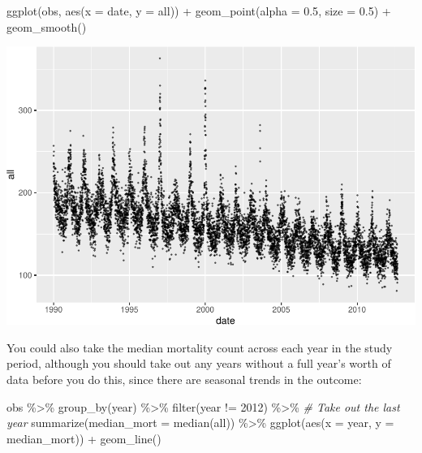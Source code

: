 \documentclass[
]{book}
\newenvironment{Shaded}{\begin{snugshade}}{\end{snugshade}}
\newcommand{\AttributeTok}[1]{\textcolor[rgb]{0.77,0.63,0.00}{#1}}
\newcommand{\CommentTok}[1]{\textcolor[rgb]{0.56,0.35,0.01}{\textit{#1}}}
\newcommand{\DecValTok}[1]{\textcolor[rgb]{0.00,0.00,0.81}{#1}}
\newcommand{\FloatTok}[1]{\textcolor[rgb]{0.00,0.00,0.81}{#1}}
\newcommand{\FunctionTok}[1]{\textcolor[rgb]{0.00,0.00,0.00}{#1}}
\newcommand{\NormalTok}[1]{#1}
\newcommand{\SpecialCharTok}[1]{\textcolor[rgb]{0.00,0.00,0.00}{#1}}
\begin{document}
\begin{Shaded}
\begin{Highlighting}[]
\FunctionTok{ggplot}\NormalTok{(obs, }\FunctionTok{aes}\NormalTok{(}\AttributeTok{x =}\NormalTok{ date, }\AttributeTok{y =}\NormalTok{ all)) }\SpecialCharTok{+} 
  \FunctionTok{geom\_point}\NormalTok{(}\AttributeTok{alpha =} \FloatTok{0.5}\NormalTok{, }\AttributeTok{size =} \FloatTok{0.5}\NormalTok{) }\SpecialCharTok{+} 
  \FunctionTok{geom\_smooth}\NormalTok{()}
\end{Highlighting}
\end{Shaded}

\includegraphics{adv_epi_analysis_files/figure-latex/unnamed-chunk-14-1.pdf}

You could also take the median mortality count across each year in the
study period, although you should take out any years without a full year's
worth of data before you do this, since there are seasonal trends in the
outcome:

\begin{Shaded}
\begin{Highlighting}[]
\NormalTok{obs }\SpecialCharTok{\%\textgreater{}\%} 
  \FunctionTok{group\_by}\NormalTok{(year) }\SpecialCharTok{\%\textgreater{}\%} 
  \FunctionTok{filter}\NormalTok{(year }\SpecialCharTok{!=} \DecValTok{2012}\NormalTok{) }\SpecialCharTok{\%\textgreater{}\%} \CommentTok{\# Take out the last year}
  \FunctionTok{summarize}\NormalTok{(}\AttributeTok{median\_mort =} \FunctionTok{median}\NormalTok{(all)) }\SpecialCharTok{\%\textgreater{}\%} 
  \FunctionTok{ggplot}\NormalTok{(}\FunctionTok{aes}\NormalTok{(}\AttributeTok{x =}\NormalTok{ year, }\AttributeTok{y =}\NormalTok{ median\_mort)) }\SpecialCharTok{+}
  \FunctionTok{geom\_line}\NormalTok{()}
\end{Highlighting}
\end{Shaded}
\end{document}
